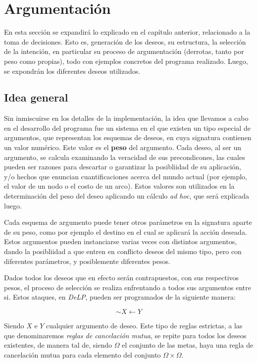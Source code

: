 \documentclass[oneside]{book}
\begin{document}
\chapter{Argumentación}

En esta sección se expandirá lo explicado en el capítulo anterior, relacionado a 
la toma de decisiones. Esto es, generación de los deseos, su estructura, la selección de la
intención, en particular su proceso de argumentación (derrotas, tanto por peso como 
propias), todo con ejemplos concretos del programa realizado. Luego, se expondrán los 
diferentes deseos utilizados.


\section{Idea general}

\label{sec:ideaGeneral}

Sin inmiscuirse en los detalles de la implementación, la idea que llevamos a cabo en el 
desarrollo del programa fue un sistema en el que existen un tipo especial de argumentos,
que representan los esquemas de deseos, en cuya signatura contienen un valor numérico.
Este valor es el \textbf{peso} %
del argumento. Cada deseo, al ser un argumento, se calcula examinando la veracidad de sus
precondicones, las cuales pueden ser razones para descartar o garantizar la posibliidad de
su aplicación, y/o hechos que enuncian cuantificaciones acerca del mundo actual (por 
ejemplo, el valor de un nodo o el costo de un arco). Estos valores son utilizados en la
determinación del peso del deseo aplicando un cálculo \textit{ad hoc}, %
que será explicada luego.

Cada esquema de argumento puede tener otros parámetros en la signatura aparte de su peso,
como por ejemplo el destino en el cual se aplicará la acción deseada. Estos argumentos
pueden instanciarse varias veces con distintos argumentos, dando la posibliidad a que 
entren en conflicto deseos del mismo tipo, pero con diferentes parámetros, y posiblemente
diferentes pesos.

Dados todos los deseos que en efecto serán contrapuestos, con sus respectivos pesos, el 
proceso de selección se realiza enfrentando a todos sus argumentos entre si. Estos 
ataques, en \textit{DeLP}, pueden ser programados de la siguiente manera:

$$ \sim X \leftarrow Y$$ 

Siendo $X$ e $Y$ cualquier argumento de deseo. Este tipo de reglas estrictas, a las que
denominaremos \textit{reglas de cancelación mutua}, se repite 
para todos los deseos existentes, de manera tal de, siendo $\Omega$ el conjunto de las 
metas, haya una regla de cancelación mutua para cada elemento del conjunto
$\Omega \times \Omega$.
\end{document}
